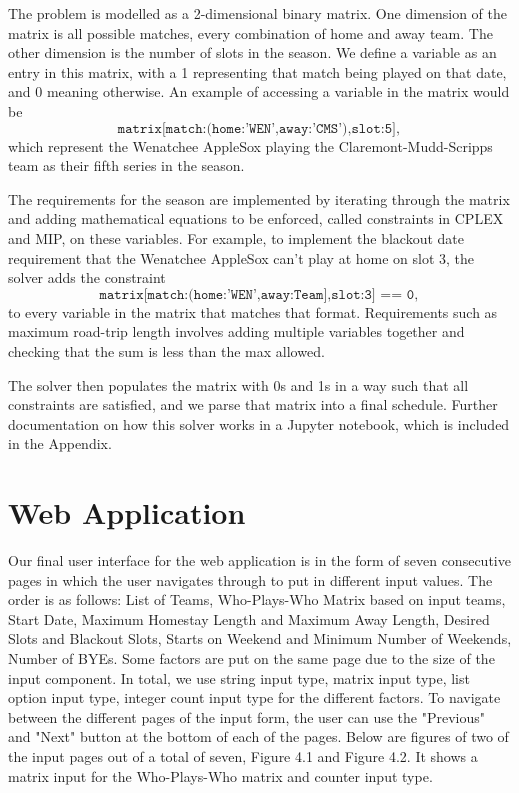 \documentclass[book]{hmcclinic}
\begin{document}
The problem is modelled as a 2-dimensional binary matrix. One dimension of the matrix is all possible matches, every combination of home and away team. The other dimension is the number of slots in the season. We define a variable as an entry in this matrix, with a 1 representing that match being played on that date, and 0 meaning otherwise. An example of accessing a variable in the matrix would be
$$\texttt{matrix[match:(home:'WEN',away:'CMS'),slot:5]},$$
which represent the Wenatchee AppleSox playing the Claremont-Mudd-Scripps team as their fifth series in the season.

The requirements for the season are implemented by iterating through the matrix and adding mathematical equations to be enforced, called constraints in CPLEX and MIP, on these variables. For example, to implement the blackout date requirement that the Wenatchee AppleSox can't play at home on slot 3, the solver adds the constraint
$$ \texttt{matrix[match:(home:'WEN',away:Team],slot:3] == 0},$$
to every variable in the matrix that matches that format. Requirements such as maximum road-trip length involves adding multiple variables together and checking that the sum is less than the max allowed.

The solver then populates the matrix with 0s and 1s in a way such that all constraints are satisfied, and we parse that matrix into a final schedule. Further documentation on how this solver works in a Jupyter notebook, which is included in the Appendix.



\section{Web Application}
Our final user interface for the web application is in the form of seven consecutive pages in which the user navigates through to put in different input values. The order is as follows: List of Teams, Who-Plays-Who Matrix based on input teams, Start Date, Maximum Homestay Length and Maximum Away Length, Desired Slots and Blackout Slots, Starts on Weekend and Minimum Number of Weekends, Number of BYEs. Some factors are put on the same page due to the size of the input component. In total, we use string input type, matrix input type, list option input type, integer count input type for the different factors. To navigate between the different pages of the input form, the user can use the "Previous" and "Next" button at the bottom of each of the pages. Below are figures of two of the input pages out of a total of seven, Figure 4.1 and Figure 4.2. It shows a matrix input for the Who-Plays-Who matrix and counter input type. 
\end{document}
